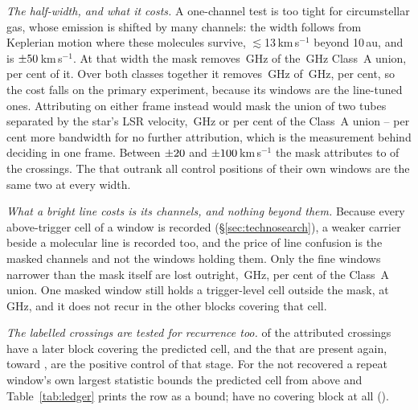 \emph{The half-width, and what it costs.} A one-channel test is too tight for
circumstellar gas, whose emission is shifted by many channels: the width
follows from Keplerian motion where these molecules survive,
$\lesssim$13\,km\,s$^{-1}$ beyond 10\,au, and is
$\pm50$\,km\,s$^{-1}$. At that width the mask removes
\MkMaskAGHz\,GHz of the \CvUnionA\,GHz Class~A union, \MkMaskAPct{} per cent
of it. Over both classes together it removes \FrMaskLostGHz\,GHz of
\FrMaskUnionGHz\,GHz, \FrMaskPct{} per cent, so the cost falls on the primary
experiment, because its windows are the line-tuned ones.
Attributing on either frame instead would mask the union of two tubes
separated by the star's LSR velocity, \LsMaskTwoGHz\,GHz or
\LsMaskTwoPct{} per cent of the Class~A union -- \LsMaskAddPct{} per cent
more bandwidth for no further attribution, which is the measurement behind
deciding in one frame. Between $\pm20$ and
$\pm100$\,km\,s$^{-1}$ the mask attributes \FrAttrWTwenty{} to
\FrAttrWHundred{} of the crossings. The \FrNRankPass{} that outrank all
\NCtrl{} control positions of their own windows are the same two at every
width.

\emph{What a bright line costs is its channels, and nothing beyond them.}
Because every above-trigger cell of a window is recorded
(\S\ref{sec:technosearch}), a weaker carrier beside a molecular line is
recorded too, and the price of line confusion is the masked channels and not
the windows holding them. Only the \MkNWholly{} fine windows narrower than
the mask itself are lost outright, \MkWhollyGHz\,GHz, \MkWhollyPct{} per
cent of the Class~A union. One masked window still holds a trigger-level cell
outside the mask, \MkSurvStar{} at \MkSurvFreq\,GHz, and it does not recur in
the \MkSurvNRep{} other blocks covering that cell.

\emph{The labelled crossings are tested for recurrence too.} \MkAttrTested{}
of the \MkAttr{} attributed crossings have a later block covering the
predicted cell, and the \MkAttrRecur{} that are present again, toward
\MkAttrRecurStars, are the positive control of that stage. For the
\MkAttrExcl{} not recovered a repeat window's own largest statistic bounds
the predicted cell from above and Table~\ref{tab:ledger} prints the row as a
bound; \MkAttrUntest{} have no covering block at all
(\MkAttrUntestNames).


